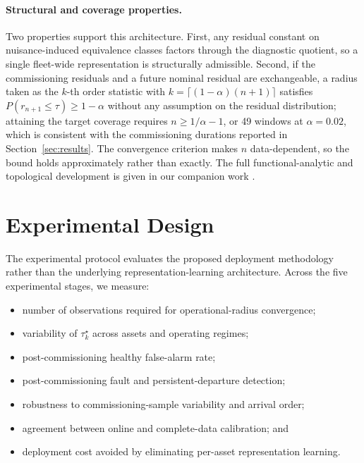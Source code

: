\documentclass[numbered]{trbunofficial}
\begin{document}
\paragraph{Structural and coverage properties.}
Two properties support this architecture. First, any residual constant on
nuisance-induced equivalence classes factors through the diagnostic quotient,
so a single fleet-wide representation is structurally admissible. Second, if
the commissioning residuals and a future nominal residual are exchangeable, a
radius taken as the $k$-th order statistic with
$k=\lceil(1-\alpha)(n+1)\rceil$ satisfies $P(r_{n+1}\le\tau)\ge 1-\alpha$
without any assumption on the residual distribution; attaining the target
coverage requires $n\ge 1/\alpha-1$, or 49 windows at $\alpha=0.02$, which is
consistent with the commissioning durations reported in
Section~\ref{sec:results}. The convergence criterion makes $n$ data-dependent,
so the bound holds approximately rather than exactly. The full
functional-analytic and topological development is given in our companion work
\citep{disanti2026quotient,disanti2026inverse}.

\section{Experimental Design}
\label{sec:experimental_design}

The experimental protocol evaluates the proposed deployment methodology rather
than the underlying representation-learning architecture. Across the five
experimental stages, we measure:

\begin{itemize}[leftmargin=1.5em]
    \item number of observations required for operational-radius convergence;
    \item variability of $\tau_k^\star$ across assets and operating regimes;
    \item post-commissioning healthy false-alarm rate;
    \item post-commissioning fault and persistent-departure detection;
    \item robustness to commissioning-sample variability and arrival order;
    \item agreement between online and complete-data calibration; and
    \item deployment cost avoided by eliminating per-asset representation learning.
\end{itemize}
\end{document}
